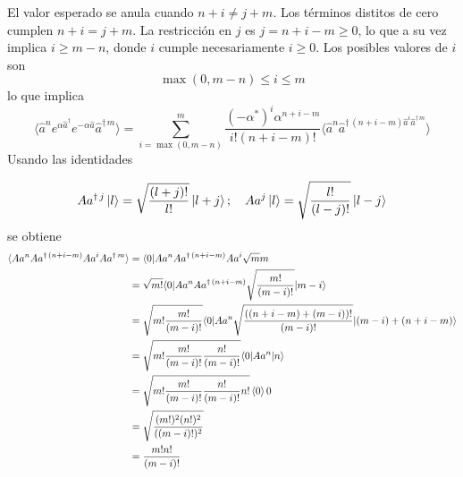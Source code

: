 \begin{enumerate}
El valor esperado se anula cuando $n+i\neq j + m$. Los términos distitos de cero cumplen $n+i = j+m$. La restricción en $j$ es $j=n+i-m\geq0$, lo que a su vez implica $i\geq m-n$, donde $i$ cumple necesariamente $i\geq0$. Los posibles valores de $i$ son
\begin{equation*}
\max(0, m-n)\leq i \leq m
\end{equation*}
lo que implica
\begin{equation*}
\langle \hat{a}^{n} e^{\alpha\hat{a}^{\dagger}} e^{-\alpha \hat{a}} \hat{a}^{\dagger\,m} \rangle = \sum_{i=\max(0, m-n)}^{m}\frac{(-\alpha^{*})^{i}\alpha^{n+i-m}}{i! (n+i-m)!} \langle \hat{a}^{n} \hat{a}^{\dagger\,(n+i-m) \hat{a}^{i} \hat{a}^{\dagger\,m}} \rangle
\end{equation*}
Usando las identidades


\begin{equation}
A{a}^{\dagger\,j} \ket{l} = \sqrt{\frac{(l+j)!}{l!}} \ket{l+j}; \quad A{a}^{j}\ket{l}=\sqrt{\frac{l!}{(l-j)!}}\ket{l-j} \label{eq:9-3}
\end{equation}
se obtiene
\begin{align*}
\langle A{a}^{n} A{a}^{\dagger\,(n+i-m)} A{a}^{i} A{a}^{\dagger\,m} \rangle & = \langle 0 \vert A{a}^{n} A{a}^{\dagger\,(n+i-m)} A{a}^{i} \sqrt{m}{m} \\
& = \sqrt{m!} \langle 0 \vert A{a}^{n} A{a}^{\dagger\,(n+i-m)} \sqrt{\frac{m!}{(m-i)!}} \vert m-i \rangle                             \\
& = \sqrt{m!\frac{m!}{(m-i)!}} \langle 0 \vert A{a}^{n} \sqrt{\frac{((n+i-m) + (m-i))!}{(m-i)!}} \vert (m-i) + (n+i-m)\rangle \\
& = \sqrt{m! \frac{m!}{(m-i)!} \frac{n!}{(m-i)!}} \langle 0 \vert A{a}^{n} \vert n\rangle                                      \\
& = \sqrt{m! \frac{m!}{(m-i)!} \frac{n!}{(m-i)!} n!} \braket{0}{0}                                                    \\
& = \sqrt{\frac{(m!)^2 (n!)^2}{((m-i)!)^2}}                                                                           \\
& = \frac{m!n!}{(m-i)!}
\end{align*}


\end{enumerate}
